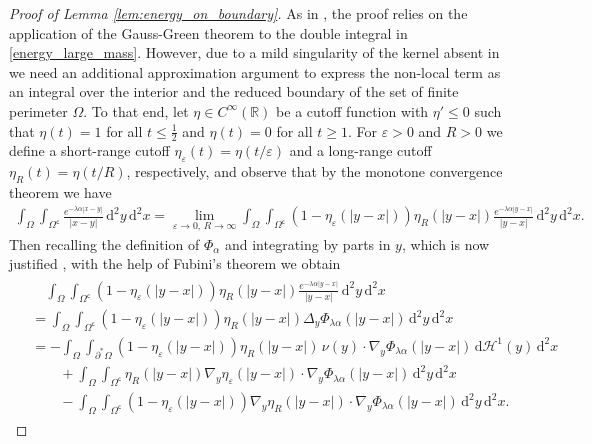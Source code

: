 \documentclass[11pt]{article}
\numberwithin{statement}{section}
\numberwithin{equation}{section}
\theoremstyle{remark}
\newcommand{\R}{\mathbb R} 				%
\newcommand{\intd}{\, \mathrm{d}} 				%
\newcommand{\stcomp}[1]{{#1}^{\mathsf{c}}}		%
\newcommand{\eps}{\varepsilon}
\begin{document}
\begin{proof}[Proof of Lemma \ref{lem:energy_on_boundary}]
  As in \cite{muratov2018nonlocal}, the proof relies on the
  application of the Gauss-Green theorem to the double integral in
  \eqref{energy_large_mass}. However, due to a mild singularity of the
  kernel absent in \cite{muratov2018nonlocal} we need an additional
  approximation argument to express the non-local term as an integral
  over the interior and the reduced boundary of the set of finite
  perimeter $\Omega$.  To that end, let $\eta \in C^\infty(\R)$ be a
  cutoff function with $\eta' \leq 0$ such that $\eta(t) = 1$ for all
  $t \leq \frac12$ and $\eta(t) = 0$ for all $t \geq 1$. For
  $\eps > 0$ and $R > 0$ we define a short-range cutoff
  $\eta_\eps(t) = \eta(t / \eps)$ and a long-range cutoff
  $\eta_R(t) = \eta(t / R)$, respectively, and observe that by the
  monotone convergence theorem we have
    \begin{align}\label{eq:cutoff_approx}
      \int_\Omega \int_{\stcomp{\Omega}} \frac{e^{-\lambda
      \alpha |x-y|}}{|x-y|} \intd^2 y \intd^2 x = \lim_{\eps \to 0, \, R \to
      \infty} \int_\Omega \int_{\stcomp{\Omega}} (1 - \eta_\eps(|y -
      x|)) \eta_R(|y - x|) \frac{e^{-\lambda
      \alpha |y-x|}}{|y-x|} \intd^2 y \intd^2 x.
    \end{align}
    Then recalling the definition of $\Phi_\alpha$ and integrating by
    parts in $y$, which is now justified \cite{ambrosio}, with the
    help of Fubini's theorem we obtain
    \begin{align} \label{bigints}
      \begin{split}
        & \quad \int_\Omega \int_{\stcomp{\Omega}} (1 - \eta_\eps(|y -
        x|)) \eta_R(|y - x|) \frac{e^{-\lambda
            \alpha |y-x|}}{|y-x|} \intd^2 y \intd^2 x \\
        & = \int_\Omega \int_{\stcomp{\Omega}} (1 - \eta_\eps(|y -
        x|)) \eta_R(|y - x|) \Delta_y \Phi_{\lambda
          \alpha}(|y - x|) \intd^2 y \intd^2 x \\
        & = - \int_\Omega \int_{\partial^* \Omega} (1 - \eta_\eps(|y -
        x|)) \eta_R(|y - x|) \, \nu(y) \cdot \nabla_y \Phi_{\lambda
          \alpha}(|y - x|) \intd \mathcal H^1(y) \intd^2 x \\
        &\qquad + \int_\Omega \int_{\stcomp{\Omega}} \eta_R(|y - x|)
        \nabla_y \eta_\eps(|y - x|) \cdot \nabla_y \Phi_{\lambda
          \alpha}(|y - x|) \intd^2 y \intd^2 x \\
        &\qquad - \int_\Omega \int_{\stcomp{\Omega}} (1 - \eta_\eps(|y
        - x|)) \nabla_y \eta_R(|y - x|) \cdot \nabla_y \Phi_{\lambda
          \alpha}(|y - x|) \intd^2 y \intd^2 x .
      \end{split}
    \end{align}


\end{proof}
\end{document}
